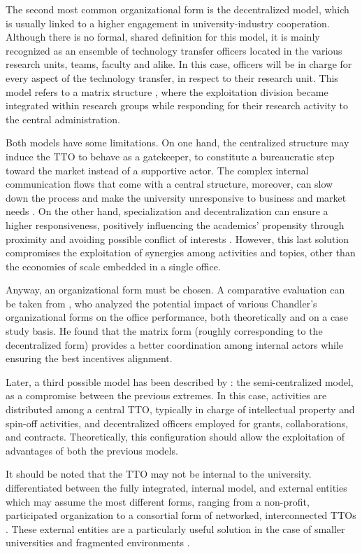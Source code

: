 The second most common organizational form is the decentralized model, which is usually linked to a higher engagement in university-industry cooperation. Although there is no formal, shared definition for this model, it is mainly recognized as an ensemble of technology transfer officers located in the various research units, teams, faculty and alike. In this case, officers will be in charge for every aspect of the technology transfer, in respect to their research unit. This model refers to a matrix structure \citep{Debackere2005}, where the exploitation division became integrated within research groups while responding for their research activity to the central administration.

Both models have some limitations. On one hand, the centralized structure may induce the TTO to behave as a gatekeeper, to constitute a bureaucratic step toward the market instead of a supportive actor. The complex internal communication flows that come with a central structure, moreover, can slow down the process and make the university unresponsive to business and market needs \citep{Litan2008}. On the other hand, specialization and decentralization can ensure a higher responsiveness, positively influencing the academics' propensity through proximity and avoiding possible conflict of interests \citep{Debackere2005}. However, this last solution compromises the exploitation of synergies among activities and topics, other than the economies of scale embedded in a single office.

Anyway, an organizational form must be chosen. A comparative evaluation can be taken from \citet{Bercovitz2001}, who analyzed the potential impact of various Chandler's organizational forms on the office performance, both theoretically and on a case study basis. He found that the matrix form (roughly corresponding to the decentralized form) provides a better coordination among internal actors while ensuring the best incentives alignment. 

Later, a third possible model has been described by \citet{Brescia2016}: the semi-centralized model, as a compromise between the previous extremes. In this case, activities are distributed among a central TTO, typically in charge of intellectual property and spin-off activities, and decentralized officers employed for grants, collaborations, and contracts. Theoretically, this configuration should allow the exploitation of advantages of both the previous models. 

It should be noted that the TTO may not be internal to the university. \citet{Fisher2002} differentiated between the fully integrated, internal model, and external entities which may assume the most different forms, ranging from a non-profit, participated organization to a consortial form of networked, interconnected TTOs \citep{Brescia2016}. These external entities are a particularly useful solution in the case of smaller universities and fragmented environments \citep{Debackere2005}.

